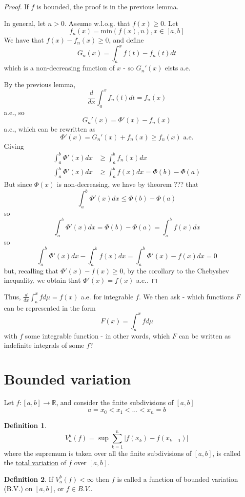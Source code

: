 \documentclass[11pt,a4paper]{report}
\theoremstyle{plain}
\theoremstyle{definition}
\newtheorem*{defn}{Definition}
\theoremstyle{remark}
\newcommand{\R}{\mathbb{R}}
\newcommand{\abs}[1]{\left| #1 \right|}
\begin{document}
\begin{proof}
  If $f$ is bounded, the proof is in the previous lemma.

  In general, let $n > 0$. Assume w.l.o.g. that $f(x) \ge 0$. Let
  $$ f_n(x) = \text{min}(f(x), n), x \in [a, b] $$
  We have that $f(x) - f_n(x) \ge 0$, and define
  $$ G_n(x) = \int_a^x f(t) - f_n(t) dt $$
  which is a non-decreasing function of $x$ - so $G_n'(x)$ eists a.e.

  By the previous lemma,
  $$ \frac{d}{dx} \int_a^x f_n(t) dt = f_n(x) $$
  a.e., so
  $$ G_n'(x) = \Phi'(x) - f_n(x) $$
  a.e., which can be rewritten as
  $$ \Phi'(x) = G_n'(x) + f_n(x) \ge f_n(x) \text{ a.e.} $$
  Giving
  \begin{align*}
    \int_a^b \Phi'(x) dx &\ge \int_a^b f_n(x) dx \\
    \int_a^b \Phi'(x) dx &\ge \int_a^b f(x) dx = \Phi(b) - \Phi(a)
  \end{align*}
  But since $\Phi(x)$ is non-decreasing, we have by theorem ??? that
  $$ \int_a^b \Phi'(x) dx \le \Phi(b) - \Phi(a)$$
  so
  $$ \int_a^b \Phi'(x) dx = \Phi(b) - \Phi(a) = \int_a^b f(x) dx $$
  so
  $$ \int_a^b \Phi'(x) dx - \int_a^b f(x) dx = \int_a^b \Phi'(x) - f(x) dx = 0 $$
  but, recalling that $\Phi'(x) - f(x) \ge 0$, by the corollary to the Chebyshev inequality, we obtain that $\Phi'(x) = f(x)$ a.e..
\end{proof}

Thus, $\frac{d}{dx}\int_a^x f d\mu = f(x)$ a.e. for integrable $f$. We then ask - which functions $F$ can be represented in the form
$$ F(x) = \int_a^x f d\mu $$
with $f$ some integrable function - in other words, which $F$ can be written as indefinite integrals of some $f$?

\section{Bounded variation}

Let $f: [a, b] \to \R$, and consider the finite subdivisions of $[a, b]$
$$ a = x_0 < x_1 < \dots < x_n = b $$

\begin{defn}
  $$ V_a^b (f) = \sup \sum_{k=1}^n \abs{f(x_k) - f(x_{k-1})} $$
  where the supremum is taken over all the finite subdivisions of $[a, b]$, is called the \underline{total variation} of $f$ over $[a, b]$.
\end{defn}

\begin{defn}
    If $V_a^b(f) < \infty$ then $f$ is called a function of bounded variation (B.V.) on $[a, b]$, or $f \in B.V.$.
\end{defn}
\end{document}
